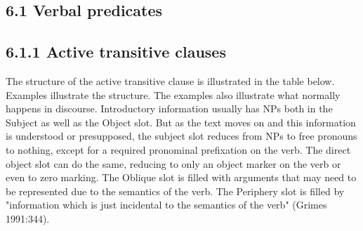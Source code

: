 \documentclass[10pt]{article}
\begin{document}
\subsection*{6.1 Verbal predicates}
\subsection*{6.1.1 Active transitive clauses}
The structure of the active transitive clause is illustrated in the table below. Examples illustrate the structure. The examples also illustrate what normally happens in discourse. Introductory information usually has NPs both in the Subject as well as the Object slot. But as the text moves on and this information is understood or presupposed, the subject slot reduces from NPs to free pronouns to nothing, except for a required pronominal prefixation on the verb. The direct object slot can do the same, reducing to only an object marker on the verb or even to zero marking. The Oblique slot is filled with arguments that may need to be represented due to the semantics of the verb. The Periphery slot is filled by "information which is just incidental to the semantics of the verb" (Grimes 1991:344).
\end{document}
